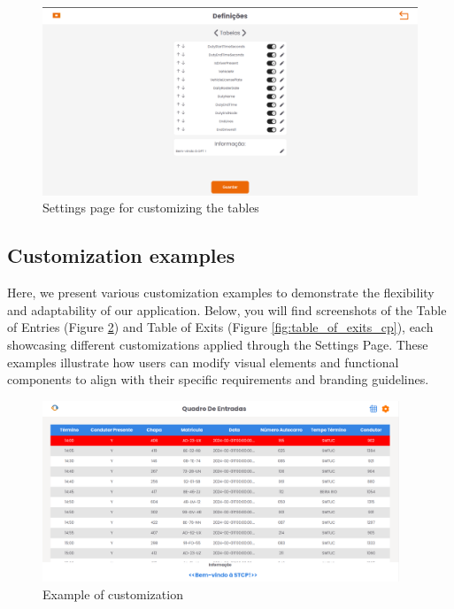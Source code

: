 \documentclass[10pt]{article}
\begin{document}
        \begin{figure}[htbp]
            \centering
            \includegraphics[width=1\textwidth]{tabelas}
            \caption{Settings page for customizing the tables}
            \label{fig:settings_tables}
        \end{figure}

        \subsection{Customization examples}

        Here, we present various customization examples to demonstrate the flexibility and adaptability of our application. Below, you will find screenshots of the Table of Entries (Figure \ref{fig:table_of_entries_stcp1}) and Table of Exits (Figure \ref{fig:table_of_exits_cp}), each showcasing different customizations applied through the Settings Page. These examples illustrate how users can modify visual elements and functional components to align with their specific requirements and branding guidelines.
        \vfill
        \begin{figure}[H]
            \centering
            \includegraphics[width=0.95\textwidth]{table_of_entries_stcp1}
            \caption{Example of customization}
            \label{fig:table_of_entries_stcp1}
        \end{figure}
\end{document}

